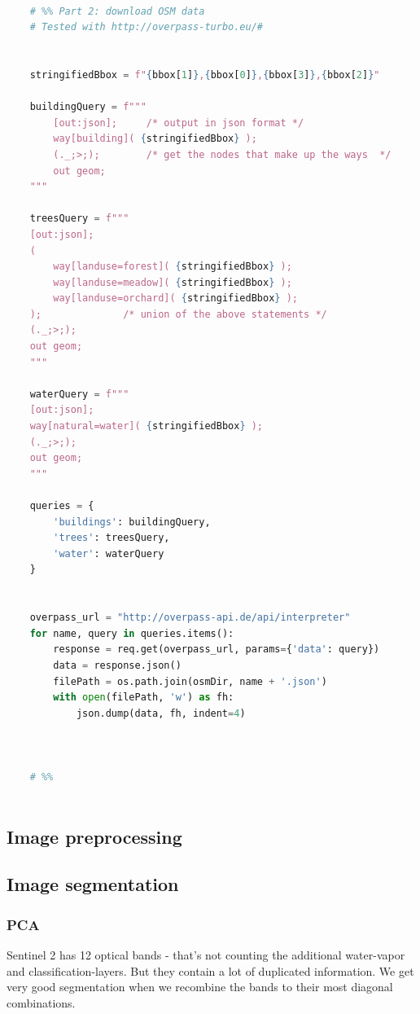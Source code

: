 \begin{lstlisting}[language=python]
    
    # %% Part 2: download OSM data
    # Tested with http://overpass-turbo.eu/#
    
    
    stringifiedBbox = f"{bbox[1]},{bbox[0]},{bbox[3]},{bbox[2]}"
    
    buildingQuery = f"""
        [out:json];     /* output in json format */
        way[building]( {stringifiedBbox} );
        (._;>;);        /* get the nodes that make up the ways  */
        out geom;
    """
    
    treesQuery = f"""
    [out:json];
    (
        way[landuse=forest]( {stringifiedBbox} );
        way[landuse=meadow]( {stringifiedBbox} );
        way[landuse=orchard]( {stringifiedBbox} );
    );              /* union of the above statements */
    (._;>;);
    out geom;
    """
    
    waterQuery = f"""
    [out:json];
    way[natural=water]( {stringifiedBbox} );
    (._;>;);
    out geom;
    """
    
    queries = {
        'buildings': buildingQuery,
        'trees': treesQuery,
        'water': waterQuery
    }
    
    
    overpass_url = "http://overpass-api.de/api/interpreter"
    for name, query in queries.items():
        response = req.get(overpass_url, params={'data': query})
        data = response.json()
        filePath = os.path.join(osmDir, name + '.json')
        with open(filePath, 'w') as fh:
            json.dump(data, fh, indent=4)
    
    
    
    # %%
    
\end{lstlisting}


\subsection{Image preprocessing}

\subsection{Image segmentation}


\subsubsection{PCA}
Sentinel 2 has 12 optical bands - that's not counting the additional water-vapor and classification-layers.
But they contain a lot of duplicated information.
We get very good segmentation when we recombine the bands to their most diagonal combinations.

